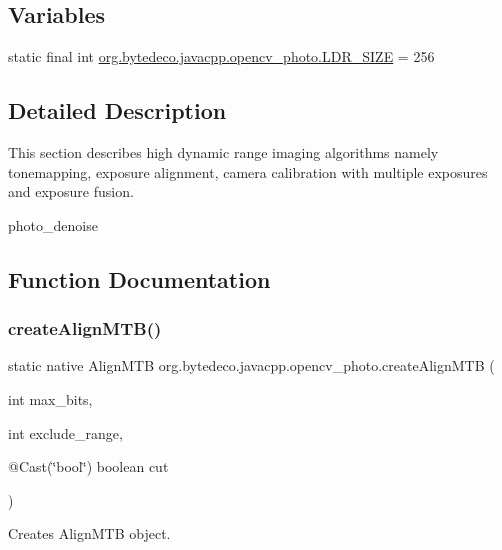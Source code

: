 \subsection*{Variables}
\begin{DoxyCompactItemize}
\item 
static final int \hyperlink{group__photo__hdr_ga98c440e0fd8daec10e153e462ade0b28}{org.\+bytedeco.\+javacpp.\+opencv\+\_\+photo.\+L\+D\+R\+\_\+\+S\+I\+ZE} = 256
\end{DoxyCompactItemize}


\subsection{Detailed Description}
This section describes high dynamic range imaging algorithms namely tonemapping, exposure alignment, camera calibration with multiple exposures and exposure fusion. 

photo\+\_\+denoise 

\subsection{Function Documentation}
\mbox{\label{group__photo__hdr_ga07eeedb34057b6d4d7c8679fda18175f}} 
\subsubsection{\texorpdfstring{create\+Align\+M\+T\+B()}{createAlignMTB()}}
{\footnotesize\ttfamily static native Align\+M\+TB org.\+bytedeco.\+javacpp.\+opencv\+\_\+photo.\+create\+Align\+M\+TB (\begin{DoxyParamCaption}\item[{int}]{max\+\_\+bits,  }\item[{int}]{exclude\+\_\+range,  }\item[{@Cast(\char`\"{}bool\char`\"{}) boolean}]{cut }\end{DoxyParamCaption})\hspace{0.3cm}{\ttfamily [static]}}



Creates Align\+M\+TB object. 


